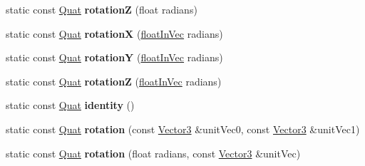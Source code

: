 \begin{DoxyCompactItemize}
\item 
\hypertarget{classVectormath_1_1Aos_1_1Quat_aa03387fa0a65a34798c2ed2707ac0d8a}{static const \hyperlink{classVectormath_1_1Aos_1_1Quat}{Quat} {\bfseries rotation\-Z} (float radians)}\label{classVectormath_1_1Aos_1_1Quat_aa03387fa0a65a34798c2ed2707ac0d8a}

\item 
\hypertarget{classVectormath_1_1Aos_1_1Quat_a82b1feb32d2c6665f61f25ff6b79da0f}{static const \hyperlink{classVectormath_1_1Aos_1_1Quat}{Quat} {\bfseries rotation\-X} (\hyperlink{classVectormath_1_1floatInVec}{float\-In\-Vec} radians)}\label{classVectormath_1_1Aos_1_1Quat_a82b1feb32d2c6665f61f25ff6b79da0f}

\item 
\hypertarget{classVectormath_1_1Aos_1_1Quat_a5e755db1a40104e3cdcca034b02cc5c8}{static const \hyperlink{classVectormath_1_1Aos_1_1Quat}{Quat} {\bfseries rotation\-Y} (\hyperlink{classVectormath_1_1floatInVec}{float\-In\-Vec} radians)}\label{classVectormath_1_1Aos_1_1Quat_a5e755db1a40104e3cdcca034b02cc5c8}

\item 
\hypertarget{classVectormath_1_1Aos_1_1Quat_ab18259d07b68a212ef93f11541514e26}{static const \hyperlink{classVectormath_1_1Aos_1_1Quat}{Quat} {\bfseries rotation\-Z} (\hyperlink{classVectormath_1_1floatInVec}{float\-In\-Vec} radians)}\label{classVectormath_1_1Aos_1_1Quat_ab18259d07b68a212ef93f11541514e26}

\item 
\hypertarget{classVectormath_1_1Aos_1_1Quat_ab553fa51545d2a4df531bee913c610dc}{static const \hyperlink{classVectormath_1_1Aos_1_1Quat}{Quat} {\bfseries identity} ()}\label{classVectormath_1_1Aos_1_1Quat_ab553fa51545d2a4df531bee913c610dc}

\item 
\hypertarget{classVectormath_1_1Aos_1_1Quat_ab0bbfde8ab49a1140169921e3678f9d7}{static const \hyperlink{classVectormath_1_1Aos_1_1Quat}{Quat} {\bfseries rotation} (const \hyperlink{classVectormath_1_1Aos_1_1Vector3}{Vector3} \&unit\-Vec0, const \hyperlink{classVectormath_1_1Aos_1_1Vector3}{Vector3} \&unit\-Vec1)}\label{classVectormath_1_1Aos_1_1Quat_ab0bbfde8ab49a1140169921e3678f9d7}

\item 
\hypertarget{classVectormath_1_1Aos_1_1Quat_abbd551a9fc8e19aaa10aab402fe08ddc}{static const \hyperlink{classVectormath_1_1Aos_1_1Quat}{Quat} {\bfseries rotation} (float radians, const \hyperlink{classVectormath_1_1Aos_1_1Vector3}{Vector3} \&unit\-Vec)}\label{classVectormath_1_1Aos_1_1Quat_abbd551a9fc8e19aaa10aab402fe08ddc}


\end{DoxyCompactItemize}
